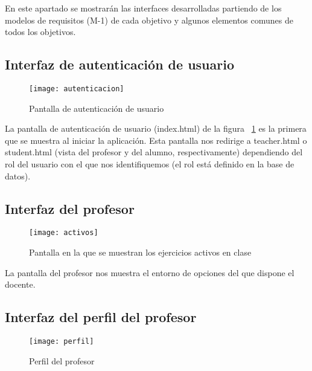En este apartado se mostrarán las interfaces desarrolladas partiendo de los modelos de requisitos (M-1) de cada objetivo y algunos elementos comunes de todos los objetivos.

\subsection{Interfaz de autenticación de usuario}
\label{diseno-e-implementacion:interfaces:autenticacion}

\begin{figure}[H]
	\centering
	\texttt{[image: autenticacion]}
	\caption{Pantalla de autenticación de usuario}
	\label{fig:autenticacion}
\end{figure}

La pantalla de autenticación de usuario (index.html) de la figura ~\ref{fig:autenticacion} es la primera que se muestra al iniciar la aplicación. Esta pantalla nos redirige a teacher.html o student.html (vista del profesor y del alumno, respectivamente) dependiendo del rol del usuario con el que nos identifiquemos (el rol está definido en la base de datos).\\

\subsection{Interfaz del profesor}
\label{diseno-e-implementacion:interfaces:profesor}

\begin{figure}[H]
	\centering
	\texttt{[image: activos]}
	\caption{Pantalla en la que se muestran los ejercicios activos en clase}
	\label{fig:activos}
\end{figure}

La pantalla del profesor nos muestra el entorno de opciones del que dispone el docente.\\

\subsection{Interfaz del perfil del profesor}
\label{diseno-e-implementacion:interfaces:perfil}

\begin{figure}[H]
	\centering
	\texttt{[image: perfil]}
	\caption{Perfil del profesor}
	\label{fig:perfil}
\end{figure}

